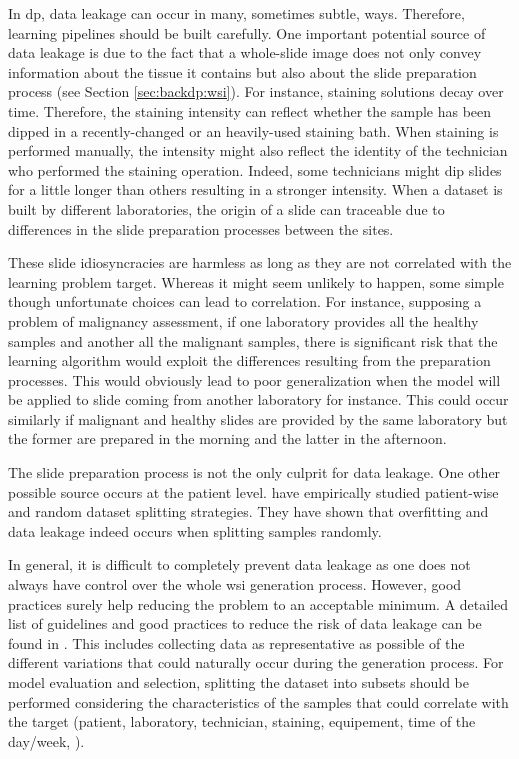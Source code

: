 In \acrlong{dp}, data leakage can occur in many, sometimes subtle, ways. Therefore, learning pipelines should be built carefully. One important potential source of data leakage is due to the fact that a whole-slide image does not only convey information about the tissue it contains but also about the slide preparation process (see Section \ref{sec:backdp:wsi}). For instance, staining solutions decay over time. Therefore, the staining intensity can reflect whether the sample has been dipped in a recently-changed or an heavily-used staining bath. When staining is performed manually, the intensity might also reflect the identity of the technician who performed the staining operation. Indeed, some technicians might dip slides for a little longer than others resulting in a stronger intensity. When a dataset is built by different laboratories, the origin of a slide can traceable due to differences in the slide preparation processes between the sites. 

These slide idiosyncracies are harmless as long as they are not correlated with the learning problem target. Whereas it might seem unlikely to happen, some simple though unfortunate choices can lead to correlation. For instance, supposing a problem of malignancy assessment, if one laboratory provides all the healthy samples and another all the malignant samples, there is significant risk that the learning algorithm would exploit the differences resulting from the preparation processes. This would obviously lead to poor generalization when the model will be applied to slide coming from another laboratory for instance. This could occur similarly if malignant and healthy slides are provided by the same laboratory but the former are prepared in the morning and the latter in the afternoon.

The slide preparation process is not the only culprit for data leakage. One other possible source occurs at the patient level. \parencite{bussola2021ai}  have empirically studied patient-wise and random dataset splitting strategies. They have shown that overfitting and data leakage indeed occurs when splitting samples randomly. 

In general, it is difficult to completely prevent data leakage as one does not always have control over the whole \acrshort{wsi} generation process. However, good practices surely help reducing the problem to an acceptable minimum. A detailed list of guidelines and good practices to reduce the risk of data leakage can be found in \parencite{maree2017need}. This includes collecting data as representative as possible of the different variations that could naturally occur during the generation process. For model evaluation and selection, splitting the dataset into subsets should be performed considering the characteristics of the samples that could correlate with the target (\ie patient, laboratory, technician, staining, equipement, time of the day/week, \etc).


